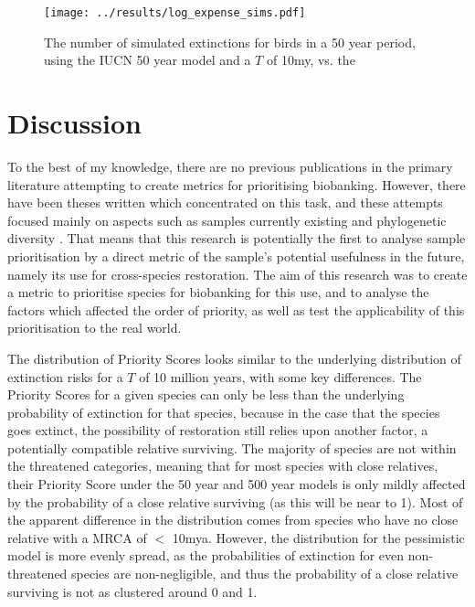 \documentclass[12pt]{article}
\begin{document}
	
	\begin{figure}
		\texttt{[image: ../results/log\_expense\_sims.pdf]}
		\caption{The number of simulated extinctions for birds in a 50 year period,
		using the IUCN 50 year model and a $T$ of 10my, vs. the }\label{expense_sims}
	\end{figure}
	
	\section{Discussion}
	To the best of my knowledge, there are no previous publications in the
	primary literature attempting to create metrics for prioritising
	biobanking. However, there have been theses written which concentrated
	on this task, and these attempts focused mainly on aspects such as
	samples currently existing and phylogenetic diversity 
	\citep{mooneyValueExSitu2021,harwoodDevelopingImplementingPrioritisation2021}.
	That means that this research is potentially
	the first to analyse sample prioritisation by
	a direct metric of the sample's potential usefulness in the future,
	namely its use for cross-species restoration. The aim of this research
	was to create a metric to prioritise species for biobanking for this
	use, and to analyse the factors which affected the order of priority,
	as well as test the applicability of this prioritisation to the
	real world.
	
	The distribution of Priority Scores looks similar to the underlying
	distribution of extinction risks for a $T$ of 10 million years, with some
	key differences. The Priority Scores for a given species can only be less
	than the underlying probability of extinction for that species, because
	in the case that the species goes extinct, the possibility of restoration
	still relies upon another factor, a potentially compatible relative
	surviving. The
	majority of species are not within the threatened categories, meaning
	that for most species with close relatives, their Priority Score under
	the 50 year and 500 year models is only
	mildly affected by the probability of a close relative surviving (as this
	will be near to 1). Most of the apparent difference in the distribution
	comes from species who have no close relative with a MRCA of $<$ 10mya.
	However, the distribution for the pessimistic model is more evenly spread,
	as the probabilities of extinction for even non-threatened species are
	non-negligible, and thus the probability of a close relative surviving
	is not as clustered around 0 and 1.
	
\end{document}
